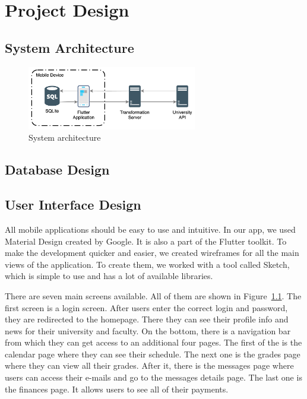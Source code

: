 \chapter{Project Design}
\section{System Architecture}

\begin{figure}[htb]
    \centering
    \includegraphics[width=0.66\textwidth]{fig04/system_architecture.png}
    \caption{System architecture}
    \label{fig:ux-flow}
\end{figure}

\section{Database Design}
\section{User Interface Design}

All mobile applications should be easy to use and intuitive. In our app, we used Material Design created by Google. It is also a part of the Flutter toolkit. To make the development quicker and easier, we created wireframes for all the main views of the application. To create them, we worked with a tool called Sketch, which is simple to use and has a lot of available libraries.

There are seven main screens available. All of them are shown in Figure~\ref{fig:ux-flow}. The first screen is a login screen. After users enter the correct login and password, they are redirected to the homepage. There they can see their profile info and news for their university and faculty. On the bottom, there is a navigation bar from which they can get access to an additional four pages. The first of the is the calendar page where they can see their schedule. The next one is the grades page where they can view all their grades. After it, there is the messages page where users can access their e-mails and go to the messages details page. The last one is the finances page. It allows users to see all of their payments.

